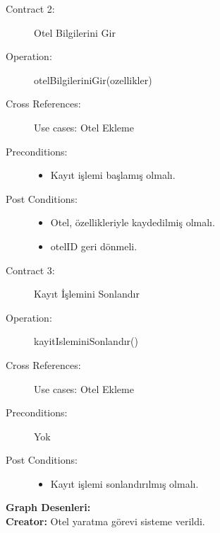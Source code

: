 \documentclass[12pt,a4paper]{report}
\begin{document}
\begin{description}
\item[Contract 2:] Otel Bilgilerini Gir
\item[Operation:] otelBilgileriniGir(ozellikler)
\item[Cross References:] Use cases: Otel Ekleme
\item[Preconditions:] \hspace{10 mm}
\begin{itemize}
\item Kayıt işlemi başlamış olmalı.
\end{itemize}
\item[Post Conditions:] \hspace{10 mm}
\begin{itemize} 
\item Otel, özellikleriyle kaydedilmiş olmalı.
\item otelID geri dönmeli. \\
\end{itemize}
\end{description}

\begin{description}
\item[Contract 3:] Kayıt İşlemini Sonlandır
\item[Operation:] kayitIsleminiSonlandır()
\item[Cross References:] Use cases: Otel Ekleme
\item[Preconditions:] Yok
\item[Post Conditions:] \hspace{10 mm}
\begin{itemize} 
\item Kayıt işlemi sonlandırılmış olmalı. \\
\end{itemize}
\end{description}

\newpage
{\bf Graph Desenleri:}\\
{\bf Creator:} Otel yaratma görevi sisteme verildi.\\
\end{document}
